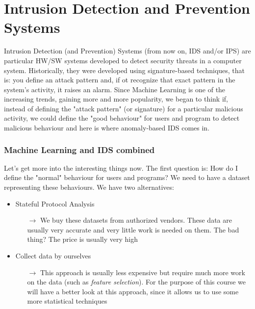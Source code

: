 \chapter{Intrusion Detection and Prevention Systems}

Intrusion Detection (and Prevention) Systems (from now on, IDS and/or IPS) are particular HW/SW systems developed to detect security threats in a computer system.\newline
Historically, they were developed using signature-based techniques, that is: you define an attack pattern and, if ot recognize that exact pattern in the system's activity, it raises an alarm.\newline\newline
Since Machine Learning is one of the increasing trends, gaining more and more popularity, we began to think if, instead of defining the "attack pattern" (or signature) for a particular malicious activity, we could define the "good behaviour" for users and program to detect malicious behaviour and here is where anomaly-based IDS comes in.

\subsection{Machine Learning and IDS combined}

Let's get more into the interesting things now. The first question is: How do I define the "normal" behaviour for users and programs? We need to have a dataset representing these behaviours. We have two alternatives:

\begin{itemize}
	\item Stateful Protocol Analysis
		\begin{itemize}
			\item[$\rightarrow$] We buy these datasets from authorized vendors. These data are usually very accurate and very little work is needed on them. The bad thing? The price is usually very high
		\end{itemize}
	\item Collect data by ourselves
		\begin{itemize}
			\item[$\rightarrow$] This approach is usually less expensive but require much more work on the data (such as \emph{feature selection}). For the purpose of this course we will have a better look at this approach, since it allows us to use some more statistical techniques
		\end{itemize}
\end{itemize}

